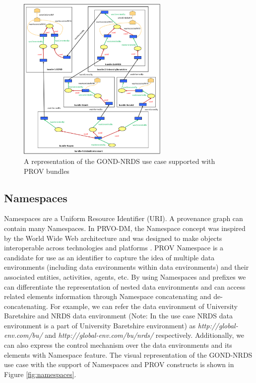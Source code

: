\begin{figure}[!htbp]
\includegraphics[width=\linewidth, height=8cm]{bundle.png}
\caption{A representation of the GOND-NRDS use case supported with PROV bundles} \label{fig:bundle}
\end{figure}

\subsection{Namespaces} \label{subsec:namespaces}
Namespaces are a Uniform Resource Identifier (URI). A provenance graph can contain many Namespaces. In PRVO-DM, the Namespace concept was inspired by the World Wide Web architecture and was designed to make objects interoperable across technologies and platforms \cite{moreau2015rationale}. 
PROV Namespace is a candidate for use as an identifier to capture the idea of multiple data environments (including data environments within data environments) and their associated entities, activities, agents, etc. 
By using Namespaces and  prefixes we can differentiate the representation of nested data environments and  can access related elements information through Namespace concatenating and de-concatenating. For example, we can refer the data environment of University  Baretshire and NRDS data environment (Note: In the use case NRDS data environment is a part of University Baretshire environment) as \textit{http://global-env.com/bu/ 
} and  \textit{http://global-env.com/bu/nrds/ 
} respectively. Additionally, we can also express the control mechanism over the data environments and its elements  with  Namespace feature. The visual representation of the GOND-NRDS use case  with the support of Namespaces and PROV constructs is shown in Figure \ref{fig:namespaces}.


